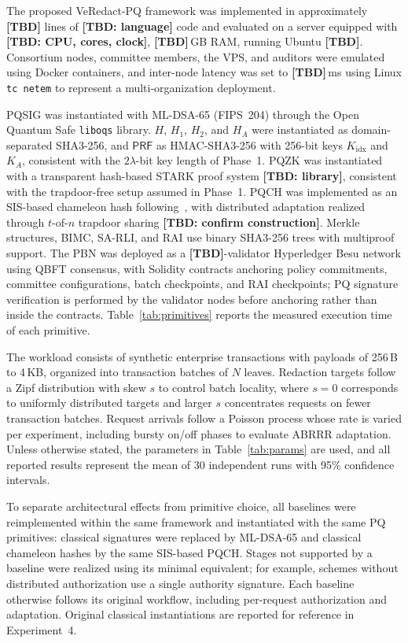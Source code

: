 \documentclass[lettersize,journal]{IEEEtran}
\begin{document}
The proposed VeRedact-PQ framework was implemented in approximately
\textbf{[TBD]} lines of \textbf{[TBD: language]} code and evaluated on a
server equipped with \textbf{[TBD: CPU, cores, clock]},
\textbf{[TBD]}\,GB RAM, running Ubuntu \textbf{[TBD]}. Consortium nodes,
committee members, the VPS, and auditors were emulated using Docker
containers, and inter-node latency was set to \textbf{[TBD]}\,ms using
Linux \texttt{tc netem} to represent a multi-organization deployment.

PQSIG was instantiated with ML-DSA-65 (FIPS~204) through the Open Quantum
Safe \texttt{liboqs} library. $H$, $H_1$, $H_2$, and $H_A$ were
instantiated as domain-separated SHA3-256, and $\mathsf{PRF}$ as
HMAC-SHA3-256 with 256-bit keys $K_{\mathrm{idx}}$
and $K_A$, consistent with the $2\lambda$-bit key length of Phase~1. PQZK was instantiated with a transparent hash-based
STARK proof system \textbf{[TBD: library]}, consistent with the
trapdoor-free setup assumed in Phase~1. PQCH was implemented as an
SIS-based chameleon hash following~\cite{ref10,ref17}, with distributed
adaptation realized through $t$-of-$n$ trapdoor sharing
\textbf{[TBD: confirm construction]}. Merkle structures, BIMC, SA-RLI,
and RAI use binary SHA3-256 trees with multiproof support. The PBN was
deployed as a \textbf{[TBD]}-validator Hyperledger Besu network using
QBFT consensus, with Solidity contracts anchoring policy commitments,
committee configurations, batch checkpoints, and RAI checkpoints; PQ
signature verification is performed by the validator nodes before
anchoring rather than inside the contracts. Table~\ref{tab:primitives}
reports the measured execution time of each primitive.

The workload consists of synthetic enterprise transactions with payloads
of 256\,B to 4\,KB, organized into transaction batches of $N$ leaves.
Redaction targets follow a Zipf distribution with skew $s$ to control
batch locality, where $s=0$ corresponds to uniformly distributed targets
and larger $s$ concentrates requests on fewer transaction batches.
Request arrivals follow a Poisson process whose rate is varied per
experiment, including bursty on/off phases to evaluate ABRRR adaptation.
Unless otherwise stated, the parameters in Table~\ref{tab:params} are
used, and all reported results represent the mean of 30 independent runs
with 95\% confidence intervals.

To separate architectural effects from primitive choice, all baselines
were reimplemented within the same framework and instantiated with the
same PQ primitives: classical signatures were replaced by ML-DSA-65 and
classical chameleon hashes by the same SIS-based PQCH. Stages not
supported by a baseline were realized using its minimal equivalent; for
example, schemes without distributed authorization use a single
authority signature. Each baseline otherwise follows its original
workflow, including per-request authorization and adaptation. Original
classical instantiations are reported for reference in
Experiment~4.
\end{document}
